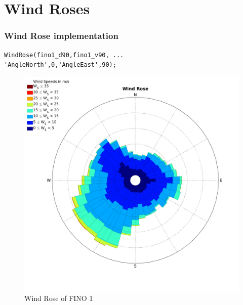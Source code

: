 \documentclass[12pt,t]{beamer}
\begin{document}
\section{Wind Roses}
\begin{frame}[fragile]
\frametitle{Wind Rose implementation}
\begin{lstlisting}
WindRose(fino1_d90,fino1_v90, ...
'AngleNorth',0,'AngleEast',90);
\end{lstlisting}
\begin{figure}
\centering
\includegraphics[width=0.3\linewidth]{../../figures/WindRose_Fino1.png}
\caption{Wind Rose of FINO 1}
\end{figure}

\end{frame}
\end{document}

